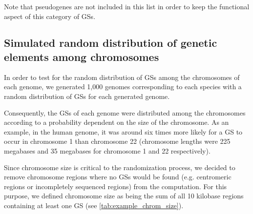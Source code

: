 Note that pseudogenes are not included in this list in order to keep the functional aspect of this category of GSs.

\subsection{Simulated random distribution of genetic elements among chromosomes}
\label{sec:rand-genet-elem}

In order to test for the random distribution of GSs among the chromosomes of each genome, we generated 1,000 genomes corresponding to each species with a random distribution of GSs for each generated genome.

Consequently, the GSs of each genome were distributed among the chromosomes according to a probability dependent on the size of the chromosome. As an example, in the human genome,  it was around six times more likely for a GS to occur in chromosome 1 than chromosome 22 (chromosome lengths were 225 megabases and 35 megabases for chromosome 1 and 22 respectively).

Since chromosome size is critical to the randomization process, we decided to remove chromosome regions where no GSs would be found (e.g. centromeric regions or incompletely sequenced regions) from the computation. For this purpose, we  defined chromosome size as being the sum of all 10 kilobase regions containing at least one GS (see \autoref{tab:example_chrom_size}).


